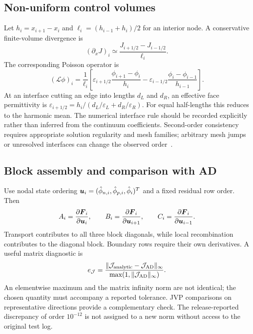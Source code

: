 \documentclass[11pt,a4paper]{article}
\numberwithin{equation}{section}
\begin{document}
\subsection{Non-uniform control volumes}
Let $h_i=x_{i+1}-x_i$ and
$\ell_i=(h_{i-1}+h_i)/2$ for an interior node. A conservative
finite-volume divergence is~\cite{eymard2000}
\begin{equation}
(\partial_xJ)_i\simeq\frac{J_{i+1/2}-J_{i-1/2}}{\ell_i}.
\end{equation}
The corresponding Poisson operator is
\begin{equation}
(\mathcal L\phi)_i=\frac{1}{\ell_i}
\left[\varepsilon_{i+1/2}\frac{\phi_{i+1}-\phi_i}{h_i}
-\varepsilon_{i-1/2}\frac{\phi_i-\phi_{i-1}}{h_{i-1}}\right].
\end{equation}
At an interface cutting an edge into lengths $d_L$ and $d_R$,
an effective face permittivity is
$\varepsilon_{i+1/2}=h_i/(d_L/\varepsilon_L+d_R/\varepsilon_R)$.
For equal half-lengths this reduces to the harmonic mean. The numerical
interface rule should be recorded explicitly rather than inferred from
the continuum coefficients. Second-order consistency requires appropriate
solution regularity and mesh families; arbitrary mesh jumps or unresolved
interfaces can change the observed order~\cite{eymard2000}.

\subsection{Block assembly and comparison with AD}
Use nodal state ordering
$\boldsymbol{u}_i=(\hat\phi_{n,i},\hat\phi_{p,i},\hat\phi_i)^T$ and a fixed
residual row order. Then
\begin{equation}
A_i=\frac{\partial\boldsymbol{F}_i}{\partial\boldsymbol{u}_i},\qquad
B_i=\frac{\partial\boldsymbol{F}_i}{\partial\boldsymbol{u}_{i+1}},\qquad
C_i=\frac{\partial\boldsymbol{F}_i}{\partial\boldsymbol{u}_{i-1}}.
\end{equation}
Transport contributes to all three block diagonals, while local
recombination contributes to the diagonal block. Boundary rows require
their own derivatives. A useful matrix diagnostic is
\begin{equation}
e_{\mathcal{J}}=\frac{\|\mathcal{J}_{\mathrm{analytic}}-\mathcal{J}_{\mathrm{AD}}\|_\infty}
{\max(1,\|\mathcal{J}_{\mathrm{AD}}\|_\infty)}.
\end{equation}
An elementwise maximum and the matrix infinity norm are not identical;
the chosen quantity must accompany a reported tolerance. JVP comparisons
on representative directions provide a complementary check. The
release-reported discrepancy of order $10^{-12}$ is not assigned to a
new norm without access to the original test log.
\end{document}
